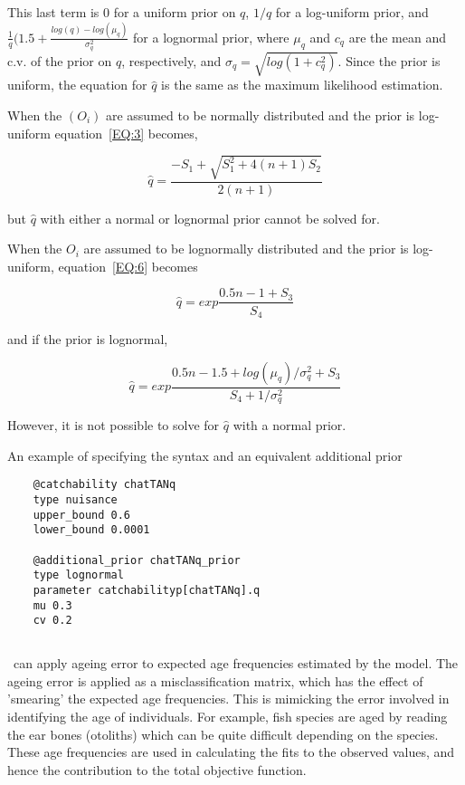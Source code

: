 This last term is 0 for a uniform prior on $q$, $1/q$ for a log-uniform prior, and $\frac{1}{q}\bigg( 1.5 + \frac{log(q) - log(\mu_q)}{\sigma_q^2}$ for a lognormal prior, where $\mu_q$ and $c_q$ are the mean and c.v. of the prior on $q$, respectively, and $\sigma_q = \sqrt{log(1+c_q^2)}$. Since the prior is uniform, the equation for $\hat q$ is the same as the maximum likelihood estimation.

When the $(O_i)$ are assumed to be normally distributed and the prior is log-uniform equation~\eqref{EQ:3} becomes,

\begin{equation}\label{EQ:7}
\hat q = \frac{-S_1 + \sqrt{S_1^2 + 4(n + 1)S_2}}{2(n+1)}
\end{equation}

but $\hat q$ with either a normal or lognormal prior cannot be solved for.

When the $O_i$ are assumed to be lognormally distributed and the prior is log-uniform, equation~\eqref{EQ:6} becomes


\begin{equation}\label{EQ:8}
\hat q = exp\frac{0.5n -1 + S_3}{S_4}
\end{equation}

and if the prior is lognormal,

\begin{equation}\label{EQ:9}
\hat q = exp\frac{0.5n -1.5 + log(\mu_q)/\sigma_q^2 + S_3}{S_4 + 1 / \sigma_q^2}
\end{equation}

However, it is not possible to solve for $\hat q$ with a normal prior.

An example of specifying the syntax and an equivalent additional prior

{\small{\begin{verbatim}
	@catchability chatTANq
	type nuisance
	upper_bound 0.6
	lower_bound 0.0001

	@additional_prior chatTANq_prior
	type lognormal
	parameter catchabilityp[chatTANq].q
	mu 0.3
	cv 0.2
\end{verbatim}}}


\subsection{}\label{sec:AgeingError}

\CNAME\ can apply ageing error to expected age frequencies estimated by the model. The ageing error is applied as a misclassification matrix, which has the effect of 'smearing' the expected age frequencies. This is mimicking the error involved in identifying the age of individuals. For example, fish species are aged by reading the ear bones (otoliths) which can be quite difficult depending on the species. These age frequencies are used in calculating the fits to the observed values, and hence the contribution to the total objective function.

